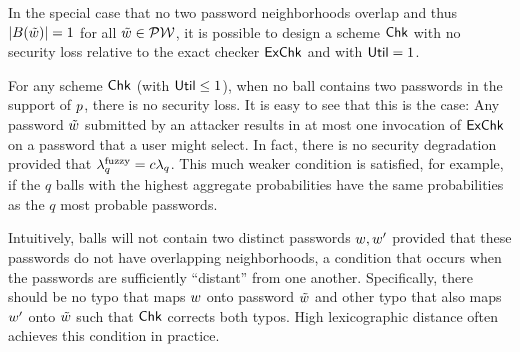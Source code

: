 

\iffalse
In the special case that no two password neighborhoods overlap and thus $|B(\tilde{w})| = 1$ for all $\tilde{w} \in \mathcal{PW}$, it is possible to design a scheme $\textnormal{\textsf{Chk}}$ with no security loss relative to the exact checker $\textnormal{\textsf{ExChk}}$ and with $\textnormal{\textsf{Util}} = 1$.

For any scheme $\textnormal{\textsf{Chk}}$ (with $\textnormal{\textsf{Util}} \leq 1$), when no ball
contains two passwords in the support of $\pwprob$, there is no
security loss. It is easy to see that this is the case: Any password
$\pwtypo$ submitted by an attacker results in at most one invocation
of $\textnormal{\textsf{ExChk}}$ on a password that a user might select. In fact, there
is no security degradation provided that
$\lambda^\textnormal{fuzzy}_q = c \lambda_q$. This much weaker condition is
satisfied, for example, if the $q$ balls with the highest aggregate
probabilities have the same probabilities as the $q$ most probable
passwords.

Intuitively, balls will not contain two distinct passwords ${w}, {w}'$ provided that these passwords do not have overlapping neighborhoods, a condition that occurs when the passwords are sufficiently ``distant'' from one another. Specifically, there should be no typo that maps $\pw$ onto password $\pwtypo$ and other typo that also maps $\pw'$ onto $\pwtypo$ such that $\textnormal{\textsf{Chk}}$ corrects both typos. High lexicographic distance often achieves this condition in practice.

\iffalse
no two neighborhoods overlap,
typo tolerance comes at no security loss. In detail, consider a
distribution $\pwprob$ and typo model $\dist$ such that for any
$\pw,\pw'\in \PW$ with $\pwprob(\pw) > 0$ and $\pwprob(\pw') > 0$
there does not exist a $\pwtypo$ such that both
$\similar_\pw(\pwtypo) >0 $ and $\similar_{\pw'}(\pwtypo)> 0 $.  In
words, this just means that there exist no points in common between the
neighborhood of any $\pw$ and $\pw'$.  Then one can in theory build a
checker that achieves acceptance utility 1 and for which
$\fuzzlambda_q = \lambda_q$ for all~$q$.
\fi

